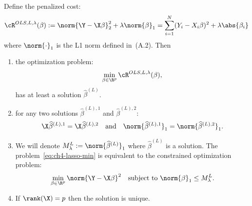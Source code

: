 \begin{proposition}\label{prop:ch4-lasso}
Define the penalized cost:
\begin{equation}\label{eq:ch4-lasso-cost}
\cR^{OLS, L, \lambda}(\beta) := \norm{\Y - \X \beta}_2^2 + \lambda \norm{\beta}_1 = \sum_{i=1}^N (Y_i - X_i \beta)^2 + \lambda \abs{\beta_i}
\end{equation}
where $\norm{\cdot}_1$ is the L1 norm defined in~(A.2). Then
\begin{enumerate}
\item the optimization problem:
\begin{equation}\label{eq:ch4-lasso-min}
\min_{\beta \in \R^p} \cR^{OLS, L, \lambda}(\beta),
\end{equation}
has at least a solution $\widehat{\beta}^{(L)}$.

\item for any two solutions $\widehat{\beta}^{(L), 1}$ and $\widehat{\beta}^{(L), 2}$:
\begin{equation}\label{eq:ch4-lasso-same-pred}
\X \widehat{\beta}^{(L), 1} = \X \widehat{\beta}^{(L), 2} \quad \text{and} \quad \norm{\widehat{\beta}^{(L), 1}}_1 = \norm{\widehat{\beta}^{(L), 2}}_1.
\end{equation}

\item We will denote $M_\lambda^L := \norm{\widehat{\beta}^{(L)}}_1$ where $\widehat{\beta}^{(L)}$ is a solution. The problem~\eqref{eq:ch4-lasso-min} is equivalent to the constrained optimization problem:
\begin{equation}\label{eq:ch4-lasso-constrained}
\min_{\beta \in \R^p} \norm{\Y - \X \beta}^2 \quad \text{subject to } \norm{\beta}_1 \le M_\lambda^L.
\end{equation}

\item If $\rank(\X) = p$ then the solution is unique.
\end{enumerate}
\end{proposition}

